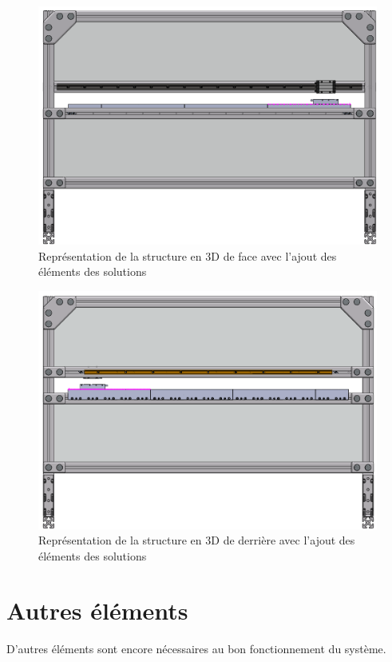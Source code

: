 \begin{figure}[H]
  \centering
  \includegraphics[width = \textwidth]{assets/figures/VueFace.png}
  \caption{Représentation de la structure en 3D de face avec l'ajout des éléments des solutions}
  \label{fig:VueFace}
\end{figure}

\begin{figure}[H]
  \centering
  \includegraphics[width = \textwidth]{assets/figures/VueDerriere.png}
  \caption{Représentation de la structure en 3D de derrière avec l'ajout des éléments des solutions}
  \label{fig:VueDerriere}
\end{figure}

\section{Autres éléments}\label{sec:AutreEle}
D'autres éléments sont encore nécessaires au bon fonctionnement du système.

